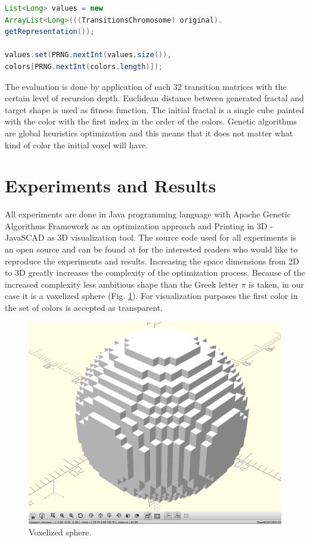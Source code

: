 \documentclass{llncs}
\begin{document}
\begin{lstlisting}[language=Java, caption=Single Voxel Color Mutation, label=listing02]
List<Long> values = new 
ArrayList<Long>(((TransitionsChromosome) original).
getRepresentation());

values.set(PRNG.nextInt(values.size()), 
colors[PRNG.nextInt(colors.length)]);
\end{lstlisting}

The evaluation is done by application of each 32 transition matrices with the certain level of recursion depth. Euclidean distance between generated fractal and target shape is used as fitness function. The initial fractal is a single cube painted with the color with the first index in the order of the colors. Genetic algorithms are global heuristics optimization and this means that it does not matter what kind of color the initial voxel will have. 

\section{Experiments and Results} \label{Experiments and Results}

All experiments are done in Java programming language with Apache Genetic Algorithms Framework \cite{apache01} as an optimization approach and Printing in 3D - JavaSCAD \cite{printing01} as 3D visualization tool. The source code used for all experiments is an open source and can be found at \cite{balabanov01} for the interested readers who would like to reproduce the experiments and results. Increasing the space dimensions from 2D to 3D greatly increases the complexity of the optimization process. Because of the increased complexity less ambitious shape than the Greek letter $\pi$ is taken, in our case it is a voxelized sphere (Fig. \ref{fig:pic02}). For visualization purposes the first color in the set of colors is accepted as transparent. 

\begin{figure}[h!]
  \centering
  \includegraphics[width=1.0\linewidth]{pic02}
  \caption{Voxelized sphere.}
\label{fig:pic02}
\end{figure}
\FloatBarrier
\end{document}
